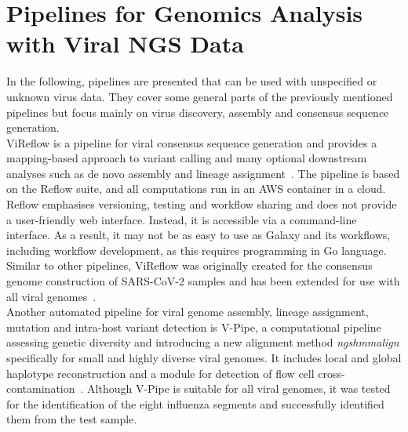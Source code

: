 \section{Pipelines for Genomics Analysis with Viral NGS Data}
In the following, pipelines are presented that can be used with unspecified or unknown virus data. They cover some general parts of the previously mentioned pipelines but focus mainly on virus discovery, assembly and consensus sequence generation. \\
ViReflow is a pipeline for viral consensus sequence generation and provides a mapping-based approach to variant calling and many optional downstream analyses such as de novo assembly and lineage assignment~\cite{moshiri2022vireflow}. The pipeline is based on the Reflow suite, and all computations run in an AWS container in a cloud. Reflow emphasises versioning, testing and workflow sharing and does not provide a user-friendly web interface. Instead, it is accessible via a command-line interface. As a result, it may not be as easy to use as Galaxy and its workflows, including workflow development, as this requires programming in Go language. Similar to other pipelines, ViReflow was originally created for the consensus genome construction of SARS-CoV-2 samples and has been extended for use with all viral genomes~\cite{moshiri2022vireflow}. \\
Another automated pipeline for viral genome assembly, lineage assignment, mutation and intra-host variant detection is V-Pipe, a computational pipeline assessing genetic diversity and introducing a new alignment method \textit{ngshmmalign} specifically for small and highly diverse viral genomes. It includes local and global haplotype reconstruction and a module for detection of flow cell cross-contamination~\cite{posada2021v}. Although V-Pipe is suitable for all viral genomes, it was tested for the identification of the eight influenza segments and successfully identified them from the test sample. \\
